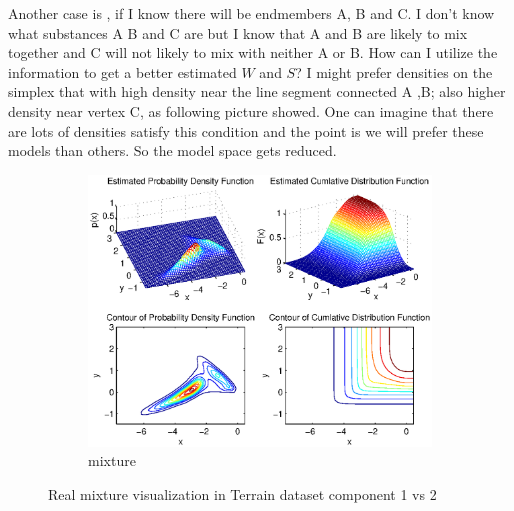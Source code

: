 \documentclass[14pt]{book}
\begin{document}
Another case is , if I know there will be endmembers A, B and C. I don't know what substances A B and C are but I know that A and B are likely to mix together and C will not likely to mix with neither A or B. How can I utilize the information to get a better estimated $W$ and $S$? I might prefer densities on the simplex that with high density near the line segment connected A ,B; also higher density near vertex C, as following picture showed. One can imagine that there are lots of densities satisfy this condition and the point is we will prefer these models than others. So the model space gets reduced. 
 \begin{figure}
        \centering
        \begin{subfigure}[b]{0.8\textwidth}
                \centering
                \includegraphics[width=\textwidth]{terrainDensity1vs2.eps}
                \caption{mixture }
                \label{fig:Mixture visualization in Terrain dataset component 1 vs 2}
        \end{subfigure}%

        \caption{Real mixture visualization in Terrain dataset component 1 vs 2 }\label{fig:animals}
\end{figure} 
\end{document}
